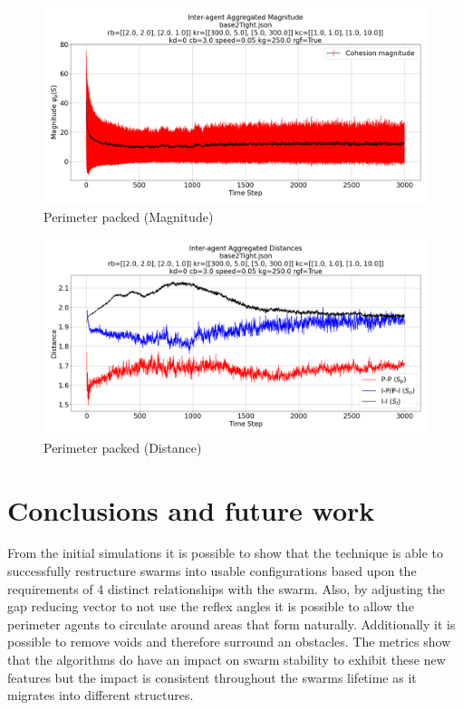 \documentclass[12pt,a4paper]{IEEEtran}
\begin{document}
\begin{figure}[H]
	\begin{center}
		\includegraphics[width=1.0\linewidth]{figures/baseline2PackedMagnitude}
	\end{center}
	\caption{Perimeter packed (Magnitude)\label{fig:baseline2PackedMagnitude}}
\end{figure}

\begin{figure}[H]
	\begin{center}
		\includegraphics[width=1.0\linewidth]{figures/baseline2PackedDistance}
	\end{center}
	\caption{Perimeter packed (Distance)\label{fig:baseline2PackedDistance}}
\end{figure}

\section{Conclusions and future work}\label{conclusions}
From the initial simulations it is possible to show that the technique is able to successfully restructure swarms into usable configurations based upon the requirements of 4 distinct relationships with the swarm. Also, by adjusting the gap reducing vector to not use the reflex angles it is possible to allow the perimeter agents to circulate around areas that form naturally. Additionally it is possible to remove voids and therefore surround an obstacles. The metrics show that the algorithms do have an impact on swarm stability to exhibit these new features but the impact is consistent throughout the swarms lifetime as it migrates into different structures.
\end{document}
